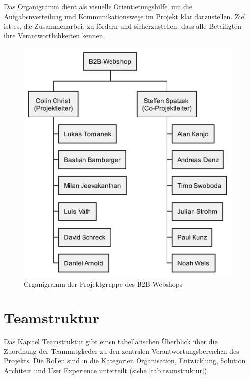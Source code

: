 \documentclass[%
	12pt,
	a4paper,
	oneside,
	parskip=full
]{scrbook}
\begin{document}
Das Organigramm dient als visuelle Orientierungshilfe, um die Aufgabenverteilung und Kommunikationswege im Projekt klar darzustellen.
Ziel ist es, die Zusammenarbeit zu fördern und sicherzustellen, dass alle Beteiligten ihre Verantwortlichkeiten kennen.
\begin{figure}[ht]
	\centering
	\includegraphics[width=0.4\linewidth]{"out/Organigramm B2B-Webshop"}
	\caption{Organigramm der Projektgruppe des B2B-Webshops}
	\label{fig:organigramm}
\end{figure}

\section{Teamstruktur}
Das Kapitel Teamstruktur gibt einen tabellarischen Überblick über die Zuordnung der Teammitglieder zu den zentralen Verantwortungsbereichen des Projekts.
Die Rollen sind in die Kategorien Organisation, Entwicklung, Solution Architect und User Experience unterteilt (siehe \cref{tab:teamstruktur}).
\end{document}
